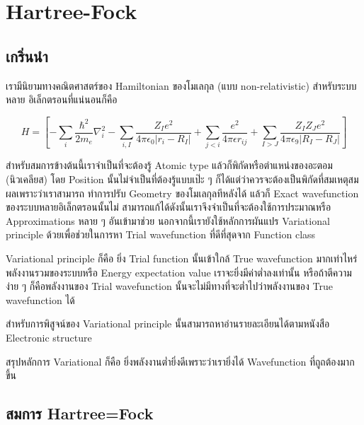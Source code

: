 
\chapter{Hartree-Fock}

\section{เกริ่นนำ}

เรามีนิยามทางคณิตศาสตร์ของ Hamiltonian ของโมเลกุล (แบบ non-relativistic) สำหรับระบบหลาย%
อิเล็กตรอนที่แน่นอนก็คือ

\begin{equation}
    H =
    \left[ 
        -\sum_{i} \frac{\hbar^{2}}{2m_{e}} \nabla^{2}_{i}
        -\sum_{i,I} \frac{Z_{I} e^{2}}{4\pi\epsilon_{0} |r_{i} - R_{I}|}
        +\sum_{j<i} \frac{e^{2}}{4\pi\epsilon r_{ij}}
        +\sum_{I>J} \frac{Z_{I} Z_{J} e^{2}}{4\pi\epsilon_{9} |R_{I} - R_{J}|}
    \right]
\end{equation}

สำหรับสมการข้างต้นนี้เราจำเป็นที่จะต้องรู้ Atomic type แล้วก็พิกัดหรือตำแหน่งของอะตอม (นิวเคลียส) 
โดย Position นั้นไม่จำเป็นที่ต้องรู้แบบเป๊ะ ๆ ก็ได้แต่ว่าควรจะต้องเป็นพิกัดที่สมเหตุสมผลเพราะว่าเราสามารถ%
ทำการปรับ Geometry ของโมเลกุลทีหลังได้ แล้วก็ Exact wavefunction ของระบบหลายอิเล็กตรอนนั้นไม่%
สามารถแก้ได้ดังนั้นเราจึงจำเป็นที่จะต้องใช้การประมาณหรือ Approximations หลาย ๆ อันเข้ามาช่วย 
นอกจากนี้เรายังใช้หลักการผันแปร Variational principle ด้วยเพื่อช่วยในการหา Trial wavefunction 
ที่ดีที่สุดจาก Function class

Variational principle ก็คือ ยิ่ง Trial function นั้นเข้าใกล้ True wavefunction มากเท่าไหร่ 
พลังงานรวมของระบบหรือ Energy expectation value เราจะยิ่งมีค่าต่ำลงเท่านั้น หรือถ้าตีความง่าย ๆ 
ก็คือพลังงานของ Trial wavefunction นั้นจะไม่มีทางที่จะต่ำไปว่าพลังงานของ True wavefunction ได้ 

สำหรับการพิสูจน์ของ Variational principle นั้นสามารถหาอ่านรายละเอียนได้ตามหนังสือ Electronic 
structure 

สรุปหลักการ Variational ก็คือ ยิ่งพลังงานต่ำยิ่งดีเพราะว่าเรายิ่งได้ Wavefunction ที่ถูถต้องมากขึ้น 

\section{สมการ Hartree=Fock}


